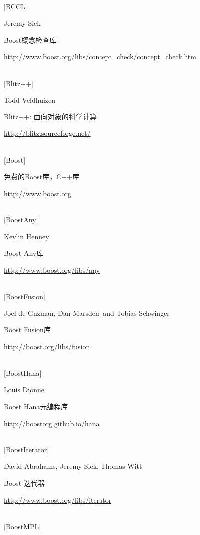 \hspace*{\fill} \\ %
{[BCCL]}

Jeremy Siek

Boost概念检查库

\url{http://www.boost.org/libs/concept_check/concept_check.htm}

\hspace*{\fill} \\ %
{[Blitz++]}

Todd Veldhuizen

Blitz++: 面向对象的科学计算

\url{http://blitz.sourceforge.net/}

\hspace*{\fill} \\ %
{[Boost]}

免费的Boost库，C++库

\url{http://www.boost.org}

\hspace*{\fill} \\ %
{[BoostAny]}

Kevlin Henney

Boost Any库

\url{http://www.boost.org/libs/any}

\hspace*{\fill} \\ %
{[BoostFusion]}

Joel de Guzman, Dan Marsden, and Tobias Schwinger

Boost Fusion库

\url{http://boost.org/libs/fusion}

\hspace*{\fill} \\ %
{[BoostHana]}

Louis Dionne

Boost Hana元编程库

\url{http://boostorg.github.io/hana}

\hspace*{\fill} \\ %
{[BoostIterator]}

David Abrahams, Jeremy Siek, Thomas Witt

Boost 迭代器

\url{http://www.boost.org/libs/iterator}

\hspace*{\fill} \\ %
{[BoostMPL]}

